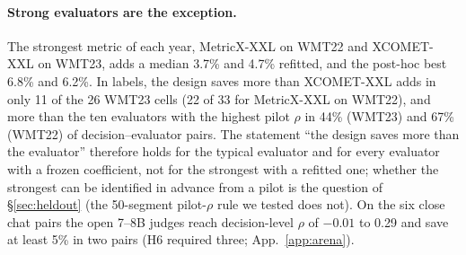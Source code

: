 \documentclass[11pt]{article}
\begin{document}
\paragraph{Strong evaluators are the exception.} The strongest metric of each year, MetricX-XXL on WMT22 and
XCOMET-XXL on WMT23, adds a median 3.7\% and 4.7\% refitted, and the post-hoc best 6.8\% and 6.2\%. In labels, the
design saves more than XCOMET-XXL adds in only 11 of the 26 WMT23 cells (22 of 33 for MetricX-XXL on WMT22), and
more than the ten evaluators with the highest pilot $\rho$ in 44\% (WMT23) and 67\% (WMT22) of decision--evaluator
pairs. The statement ``the design saves more than the evaluator'' therefore holds for the typical evaluator and for
every evaluator with a frozen coefficient, not for the strongest with a refitted one; whether the strongest can be
identified in advance from a pilot is the question of \S\ref{sec:heldout} (the 50-segment pilot-$\rho$ rule we
tested does not). On the six close chat pairs the open
7--8B judges reach decision-level $\rho$ of $-0.01$ to 0.29 and save at least 5\% in two pairs (H6 required three;
App.~\ref{app:arena}).
\end{document}
